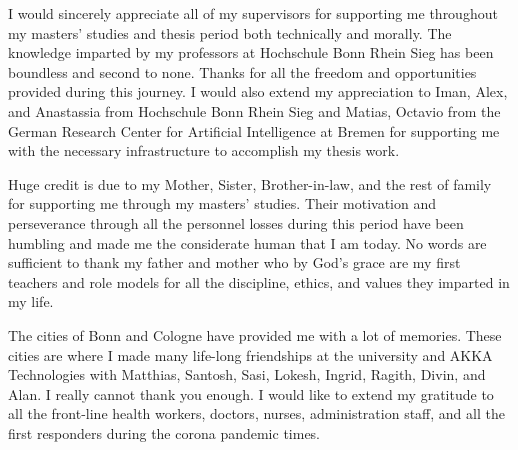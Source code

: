



\justifying

    \begin{acknowledgements}
         I would sincerely appreciate all of my supervisors for supporting me throughout my masters' studies and thesis period both technically and morally. The knowledge imparted by my professors at Hochschule Bonn Rhein Sieg has been boundless and second to none. Thanks for all the freedom and opportunities provided during this journey. I would also extend my appreciation to Iman, Alex, and Anastassia from Hochschule Bonn Rhein Sieg and Matias, Octavio from the German Research Center for Artificial Intelligence at Bremen for supporting me with the necessary infrastructure to accomplish my thesis work.
        
        Huge credit is due to my Mother, Sister, Brother-in-law, and the rest of family for supporting me through my masters' studies. Their motivation and perseverance through all the personnel losses during this period have been humbling and made me the considerate human that I am today. No words are sufficient to thank my father and mother who by God's grace are my first teachers and role models for all the discipline, ethics, and values they imparted in my life.
        
        The cities of Bonn and Cologne have provided me with a lot of memories. These cities are where I made many life-long friendships at the university and AKKA Technologies with Matthias, Santosh, Sasi, Lokesh, Ingrid, Ragith, Divin, and Alan. I really cannot thank you enough. I would like to extend my gratitude to all the front-line health workers, doctors, nurses, administration staff, and all the first responders during the corona pandemic times.
      
    \end{acknowledgements}

